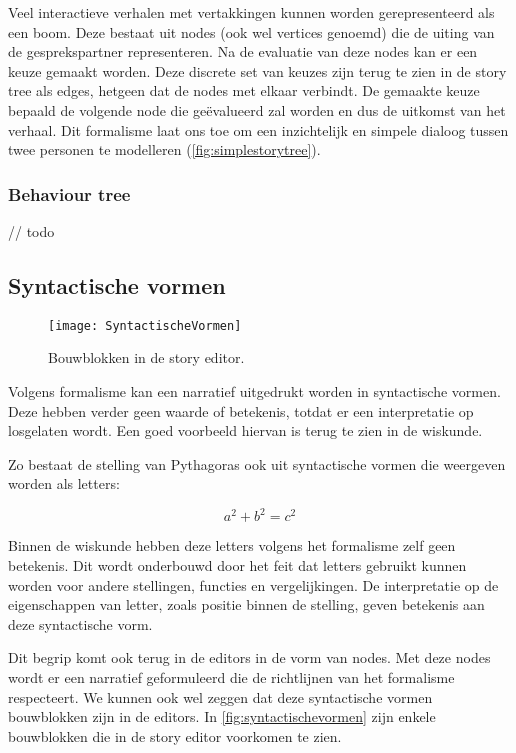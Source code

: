 Veel interactieve verhalen met vertakkingen kunnen worden gerepresenteerd als een boom\cite{GalyeanIII1995}. Deze bestaat uit nodes (ook wel vertices genoemd) die de uiting van de gesprekspartner representeren. Na de evaluatie van deze nodes kan er een keuze gemaakt worden. Deze discrete set van keuzes zijn terug te zien in de story tree als edges, hetgeen dat de nodes met elkaar verbindt. De gemaakte keuze bepaald de volgende node die geëvalueerd zal worden en dus de uitkomst van het verhaal. Dit formalisme laat ons toe om een inzichtelijk en simpele dialoog tussen twee personen te modelleren (\autoref{fig:simplestorytree}).

\subsubsection{Behaviour tree}
// todo

\pagebreak
\subsection{Syntactische vormen}

\begin{wrapfigure}{r}{0.4\textwidth}
    \centering    
    \texttt{[image: SyntactischeVormen]}
    \caption{Bouwblokken in de story editor.}
    \label{fig:syntactischevormen}
\end{wrapfigure}

Volgens formalisme kan een narratief uitgedrukt worden in syntactische vormen. Deze hebben verder geen waarde of betekenis, totdat er een interpretatie op losgelaten wordt. Een goed voorbeeld hiervan is terug te zien in de wiskunde. 

Zo bestaat de stelling van Pythagoras ook uit syntactische vormen die weergeven worden als letters:

\[ a^2 + b^2 = c^2 \]

Binnen de wiskunde hebben deze letters volgens het formalisme zelf geen betekenis. Dit wordt onderbouwd door het feit dat letters gebruikt kunnen worden voor andere stellingen, functies en vergelijkingen. De interpretatie op de eigenschappen van letter, zoals positie binnen de stelling, geven betekenis aan deze syntactische vorm.

Dit begrip komt ook terug in de editors in de vorm van nodes. Met deze nodes wordt er een narratief geformuleerd die de richtlijnen van het formalisme respecteert. We kunnen ook wel zeggen dat deze syntactische vormen bouwblokken zijn in de editors. In \autoref{fig:syntactischevormen} zijn enkele bouwblokken die in de story editor voorkomen te zien.

